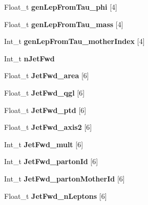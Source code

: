 \begin{DoxyCompactItemize}
Float\+\_\+t {\bfseries gen\+Lep\+From\+Tau\+\_\+phi} \mbox{[}4\mbox{]}
\item 
\hypertarget{classMiniTree_ad9876277a0d34446430cede337f88968}{}\label{classMiniTree_ad9876277a0d34446430cede337f88968} 
Float\+\_\+t {\bfseries gen\+Lep\+From\+Tau\+\_\+mass} \mbox{[}4\mbox{]}
\item 
\hypertarget{classMiniTree_aa0558c0c0e86a3688e5372ebed4b5e9d}{}\label{classMiniTree_aa0558c0c0e86a3688e5372ebed4b5e9d} 
Int\+\_\+t {\bfseries gen\+Lep\+From\+Tau\+\_\+mother\+Index} \mbox{[}4\mbox{]}
\item 
\hypertarget{classMiniTree_a118d620eba50ce08fe5b43f20e79f539}{}\label{classMiniTree_a118d620eba50ce08fe5b43f20e79f539} 
Int\+\_\+t {\bfseries n\+Jet\+Fwd}
\item 
\hypertarget{classMiniTree_a063122fa0ccf8f596b393ff6c58b9621}{}\label{classMiniTree_a063122fa0ccf8f596b393ff6c58b9621} 
Float\+\_\+t {\bfseries Jet\+Fwd\+\_\+area} \mbox{[}6\mbox{]}
\item 
\hypertarget{classMiniTree_a5069f5d93876d08b9400929a7883d4ab}{}\label{classMiniTree_a5069f5d93876d08b9400929a7883d4ab} 
Float\+\_\+t {\bfseries Jet\+Fwd\+\_\+qgl} \mbox{[}6\mbox{]}
\item 
\hypertarget{classMiniTree_aea1d393b879f92f4b0f6a4885f94a09a}{}\label{classMiniTree_aea1d393b879f92f4b0f6a4885f94a09a} 
Float\+\_\+t {\bfseries Jet\+Fwd\+\_\+ptd} \mbox{[}6\mbox{]}
\item 
\hypertarget{classMiniTree_a233a787dc333b5112e75558768bde457}{}\label{classMiniTree_a233a787dc333b5112e75558768bde457} 
Float\+\_\+t {\bfseries Jet\+Fwd\+\_\+axis2} \mbox{[}6\mbox{]}
\item 
\hypertarget{classMiniTree_aeb76558d595519c7dc71b95bbbc27ddb}{}\label{classMiniTree_aeb76558d595519c7dc71b95bbbc27ddb} 
Int\+\_\+t {\bfseries Jet\+Fwd\+\_\+mult} \mbox{[}6\mbox{]}
\item 
\hypertarget{classMiniTree_a9666e3c245c064a64d94d1a74dc8457b}{}\label{classMiniTree_a9666e3c245c064a64d94d1a74dc8457b} 
Int\+\_\+t {\bfseries Jet\+Fwd\+\_\+parton\+Id} \mbox{[}6\mbox{]}
\item 
\hypertarget{classMiniTree_a81458d2fc3ab090c3d89c4f5312d59c7}{}\label{classMiniTree_a81458d2fc3ab090c3d89c4f5312d59c7} 
Int\+\_\+t {\bfseries Jet\+Fwd\+\_\+parton\+Mother\+Id} \mbox{[}6\mbox{]}
\item 
\hypertarget{classMiniTree_aaf613a0749106ad368094262618e79c2}{}\label{classMiniTree_aaf613a0749106ad368094262618e79c2} 
Float\+\_\+t {\bfseries Jet\+Fwd\+\_\+n\+Leptons} \mbox{[}6\mbox{]}

\end{DoxyCompactItemize}
